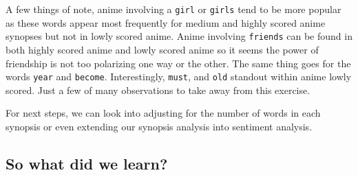\documentclass[
]{article}
\begin{document}
A few things of note, anime involving a \texttt{girl} or \texttt{girls}
tend to be more popular as these words appear most frequently for medium
and highly scored anime synopses but not in lowly scored anime. Anime
involving \texttt{friends} can be found in both highly scored anime and
lowly scored anime so it seems the power of friendship is not too
polarizing one way or the other. The same thing goes for the words
\texttt{year} and \texttt{become}. Interestingly, \texttt{must}, and
\texttt{old} standout within anime lowly scored. Just a few of many
observations to take away from this exercise.

For next steps, we can look into adjusting for the number of words in
each synopsis or even extending our synopsis analysis into sentiment
analysis.

\hypertarget{so-what-did-we-learn}{%
\subsection{So what did we learn?}\label{so-what-did-we-learn}}
\end{document}
